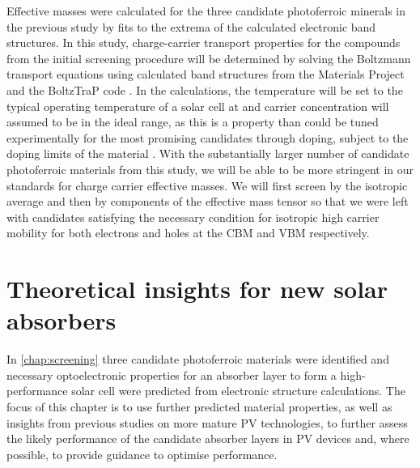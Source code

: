\documentclass[11pt, twoside]{report}
\begin{document}
Effective masses were calculated for the three candidate photoferroic minerals in the previous study by fits to the extrema of the calculated electronic band structures. In this study, charge-carrier transport properties for the compounds from the initial screening procedure will be determined by solving the Boltzmann transport equations using calculated band structures from the Materials Project and the BoltzTraP code \cite{Boltztrap}. In the calculations, the temperature will be set to the typical operating temperature of a solar cell at and carrier concentration will assumed to be in the ideal range, as this is a property than could be tuned experimentally for the most promising candidates through doping, subject to the doping limits of the material \cite{Zhang_doping_limits}. 
With the substantially larger number of candidate photoferroic materials from this study, we will be able to be more stringent in our standards for charge carrier effective masses. We will first screen by the isotropic average and then by components of the effective mass tensor so that we were left with candidates satisfying the necessary condition for isotropic high carrier mobility for both electrons and holes at the CBM and VBM respectively.



\chapter{Theoretical insights for new solar absorbers}\label{chap:insights}

In \autoref{chap:screening} three candidate photoferroic materials were identified and necessary optoelectronic properties for an absorber layer to form a high-performance solar cell were predicted from electronic structure calculations. The focus of this chapter is to use further predicted material properties, as well as insights from previous studies on more mature PV technologies, to further assess the likely performance of the candidate absorber layers in PV devices and, where possible, to provide guidance to optimise performance.
\end{document}
